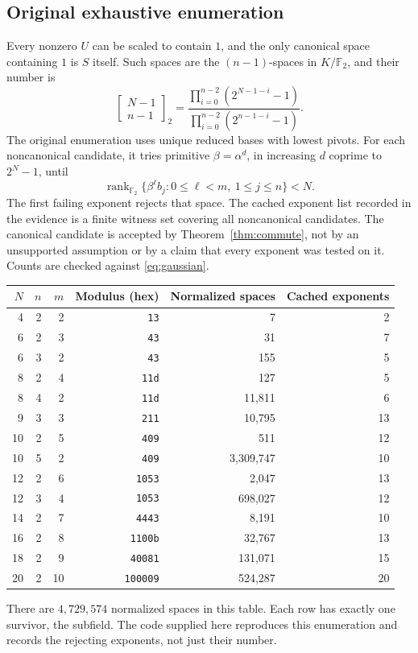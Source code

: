 \documentclass[11pt,a4paper]{article}
\theoremstyle{definition}\newtheorem{definition}[theorem]{Definition}
\theoremstyle{remark}\newtheorem{remark}[theorem]{Remark}
\newcommand{\F}{\mathbb F}
\numberwithin{equation}{section}
\begin{document}
\subsection{Original exhaustive enumeration}
Every nonzero $U$ can be scaled to contain $1$, and the only canonical space containing $1$ is $S$ itself. Such spaces are the $(n-1)$-spaces in $K/\F_2$, and their number is
\begin{equation}\label{eq:gaussian}
\begin{bmatrix}N-1\\n-1\end{bmatrix}_2
=\frac{\prod_{i=0}^{n-2}(2^{N-1-i}-1)}{\prod_{i=0}^{n-2}(2^{n-1-i}-1)}.
\end{equation}
The original enumeration uses unique reduced bases with lowest pivots. For each noncanonical candidate, it tries primitive $\beta=\alpha^d$, in increasing $d$ coprime to $2^N-1$, until
\[
\operatorname{rank}_{\F_2}\{\beta^\ell b_j:0\le\ell<m,\ 1\le j\le n\}<N.
\]
The first failing exponent rejects that space. The cached exponent list recorded in the evidence is a finite witness set covering all noncanonical candidates. The canonical candidate is accepted by Theorem~\ref{thm:commute}, not by an unsupported assumption or by a claim that every exponent was tested on it. Counts are checked against \eqref{eq:gaussian}.

\begin{center}\small
\begin{tabular}{rrrrrr}
\toprule
$N$&$n$&$m$&Modulus (hex)&Normalized spaces&Cached exponents\\\midrule
4&2&2&\texttt{13}&7&2\\
6&2&3&\texttt{43}&31&7\\
6&3&2&\texttt{43}&155&5\\
8&2&4&\texttt{11d}&127&5\\
8&4&2&\texttt{11d}&11,811&6\\
9&3&3&\texttt{211}&10,795&13\\
10&2&5&\texttt{409}&511&12\\
10&5&2&\texttt{409}&3,309,747&10\\
12&2&6&\texttt{1053}&2,047&13\\
12&3&4&\texttt{1053}&698,027&12\\
14&2&7&\texttt{4443}&8,191&10\\
16&2&8&\texttt{1100b}&32,767&13\\
18&2&9&\texttt{40081}&131,071&15\\
20&2&10&\texttt{100009}&524,287&20\\\bottomrule
\end{tabular}
\end{center}
There are $4,729,574$ normalized spaces in this table. Each row has exactly one survivor, the subfield. The code supplied here reproduces this enumeration and records the rejecting exponents, not just their number.
\end{document}
